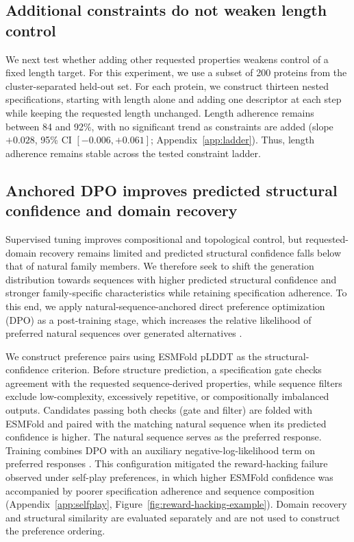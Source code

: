 \documentclass{article} %
\begin{document}
\subsection{Additional constraints do not weaken length control}

We next test whether adding other requested properties weakens control of a fixed length target. For this experiment, we use a subset of 200 proteins from the cluster-separated held-out set. For each protein, we construct thirteen nested specifications, starting with length alone and adding one descriptor at each step while keeping the requested length unchanged. Length adherence remains between 84 and 92\%, with no significant trend as constraints are added (slope $+0.028$, 95\% CI $[-0.006,+0.061]$; Appendix~\ref{app:ladder}). Thus, length adherence remains stable across the tested constraint ladder.

\subsection{Anchored DPO improves predicted structural confidence
and domain recovery}
\label{sec:dpo}

Supervised tuning improves compositional and topological control, but requested-domain recovery remains limited and predicted structural confidence falls below that of natural family members. We therefore seek to shift the generation distribution towards sequences with higher predicted structural confidence and stronger family-specific characteristics while retaining specification adherence. To this end, we apply natural-sequence-anchored direct preference optimization (DPO) as a post-training stage, which increases the relative likelihood of preferred natural sequences over generated alternatives \citep{rafailov2023dpo}. 

We construct preference pairs using ESMFold pLDDT as the structural-confidence criterion. Before structure prediction, a specification gate checks agreement with the requested sequence-derived properties, while sequence filters exclude low-complexity, excessively repetitive, or compositionally imbalanced outputs. Candidates passing both checks (gate and filter) are folded with ESMFold and paired with the matching natural sequence when its predicted confidence is higher. The natural sequence serves as the preferred response. Training combines DPO with an auxiliary negative-log-likelihood term on preferred responses \citep{pang2024rpo}. This configuration mitigated the reward-hacking failure observed
under self-play preferences, in which higher ESMFold confidence was accompanied by poorer specification adherence and sequence composition (Appendix~\ref{app:selfplay}, Figure~\ref{fig:reward-hacking-example}). Domain recovery and structural similarity are evaluated separately and are not used to construct the preference ordering.
\end{document}
